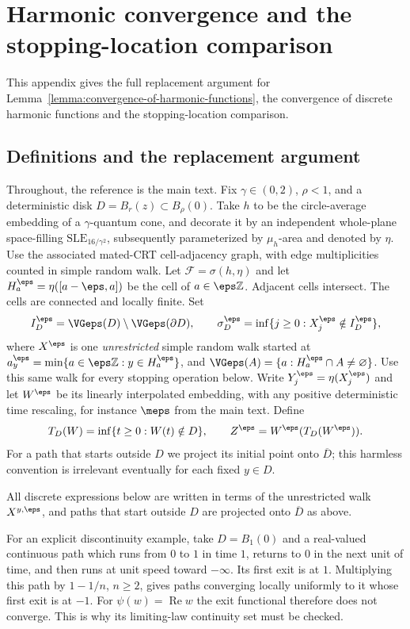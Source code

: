 \section{Harmonic convergence and the stopping-location comparison}\label{app:lemma36-C13}

This appendix gives the full replacement argument for
Lemma~\ref{lemma:convergence-of-harmonic-functions}, the convergence of
discrete harmonic functions and the stopping-location comparison.

\subsection{Definitions and the replacement argument}

Throughout, the reference is the main text.
Fix $\gamma\in(0,2)$, $\rho<1$, and a
deterministic disk $D=B_r(z)\subset B_\rho(0)$.
Take $h$ to be the circle-average embedding of a
$\gamma$-quantum cone, and decorate it by an independent
whole-plane space-filling $\mathrm{SLE}_{16/\gamma^2}$,
subsequently parameterized by $\mu_h$-area and denoted by
$\eta$. Use the associated mated-CRT cell-adjacency graph,
with edge multiplicities counted in simple random walk.
Let $\mathcal F=\sigma(h,\eta)$ and let
$H^\eps_a=\eta([a-\eps,a])$ be the cell of $a\in\eps\mathbb Z$.
Adjacent cells intersect. The cells are connected and locally finite.
Set
\[
 I^\eps_D=\VGeps(D)\setminus\VGeps(\partial D),\qquad
 \sigma^\eps_D=\inf\{j\ge0:X^\eps_j\notin I^\eps_D\},
\]
where $X^\eps$ is one \emph{unrestricted} simple random walk started
at $a_y^\eps=\min\{a\in\eps\mathbb Z:y\in H^\eps_a\}$,
and $\VGeps(A)=\{a:H^\eps_a\cap A\ne\varnothing\}$.
Use this same walk for every stopping operation below.
Write $Y^\eps_j=\eta(X^\eps_j)$ and let $W^\eps$ be its linearly
interpolated embedding, with any positive deterministic time
rescaling, for instance $\meps$ from the main text.
Define
\[
 T_D(W)=\inf\{t\ge0:W(t)\notin D\},\qquad
 Z^\eps=W^\eps(T_D(W^\eps)).
\]
For a path that starts outside $D$ we project its initial point onto
$\overline D$; this harmless convention is irrelevant eventually for
each fixed $y\in D$.

All discrete expressions below are written in terms of the unrestricted walk $X^{y,\eps}$,
and paths that start outside $D$ are projected onto $\overline D$ as above.

For an explicit discontinuity example, take $D=B_1(0)$ and a
real-valued continuous path which runs from $0$ to $1$ in time
$1$, returns to $0$ in the next unit of time, and then runs
at unit speed toward $-\infty$. Its first exit is at $1$.
Multiplying this path by $1-1/n$, $n\ge2$, gives paths converging
locally uniformly to it whose first exit is at $-1$.
For $\psi(w)=\operatorname{Re}w$ the exit functional therefore
does not converge. This is why its limiting-law continuity
set must be checked.

